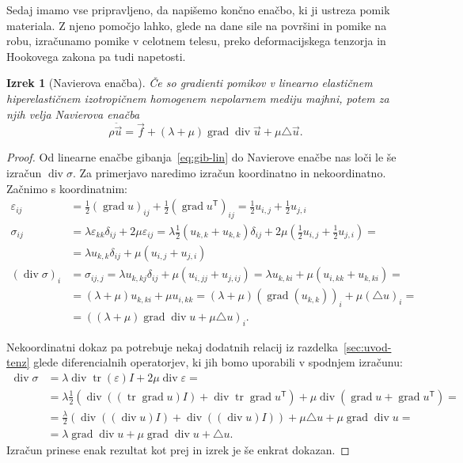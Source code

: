 \documentclass[12pt,a4paper,twoside]{article}
\theoremstyle{definition} %
\theoremstyle{plain} %
\newtheorem{izrek}[definicija]{Izrek}
\numberwithin{equation}{section}
\newcommand{\T}{\mathsf{T}}
\newcommand{\lap}{\triangle}
\renewcommand{\div}{\operatorname{div}}
\newcommand{\grad}{\operatorname{grad}}
\newcommand{\eps}{\varepsilon}
\newcommand{\vu}{\vec{u}}
\newcommand{\vf}{\vec{f}}
\newcommand{\ts}{\sigma}
\DeclareMathOperator{\tr}{tr}
\begin{document}
Sedaj imamo vse pripravljeno, da napišemo končno enačbo, ki ji ustreza pomik
materiala. Z njeno pomočjo lahko, glede na dane sile na površini in pomike na
robu, izračunamo pomike v celotnem telesu, preko deformacijskega tenzorja in
Hookovega zakona pa tudi napetosti.
\begin{izrek}[Navierova enačba]
  Če so gradienti pomikov v linearno elastičnem hiperelastičnem
  izotropičnem homogenem nepolarnem mediju majhni, potem za njih velja
  \emph{Navierova enačba}
  \begin{equation}
    \rho \ddot{\vu} = \vf + (\lambda + \mu)\grad\div \vu + \mu \lap \vu.
    \label{eq:navier}
  \end{equation}
\end{izrek}
\begin{proof}
Od linearne enačbe gibanja~\eqref{eq:gib-lin} do Navierove enačbe nas loči le še
izračun $\div \sigma$. Za primerjavo naredimo izračun koordinatno in
nekoordinatno. Začnimo s koordinatnim:
\begin{align*}
  \eps_{ij} &= \frac12 (\grad u)_{ij} + \frac12 (\grad u^\T)_{ij} =
  \frac12 u_{i,j} + \frac12 u_{j,i} \\
  \ts_{ij} &= \lambda \eps_{kk} \delta_{ij} + 2 \mu \eps_{ij} =
  \lambda \frac{1}{2} (u_{k,k} + u_{k,k}) \delta_{ij} + 2 \mu( \frac12 u_{i,j} +
  \frac12 u_{j,i}) =  \\ &= \lambda u_{k, k}\delta_{ij} + \mu (u_{i,j} +u_{j,i})
  \\
  (\div \ts)_i &= \sigma_{ij,j} = \lambda u_{k, kj}\delta_{ij} + \mu (u_{i,jj}
+u_{j,ij}) = \lambda u_{k,ki} + \mu (u_{i,kk} + u_{k,ki}) = \\
&= (\lambda + \mu)u_{k,ki} + \mu u_{i,kk} = (\lambda+\mu)(\grad(u_{k,k}))_i +
\mu (\lap u)_i = \\ &=
((\lambda + \mu)\grad\div u + \mu \lap u)_i.
\end{align*}

Nekoordinatni dokaz pa potrebuje nekaj dodatnih relacij iz
razdelka~\ref{sec:uvod-tenz} glede diferencialnih operatorjev, ki jih bomo
uporabili v spodnjem izračunu:
\begin{align*}
  \div\ts &= \lambda \div \tr(\eps) I + 2\mu \div \eps = \\ &=
  \lambda \frac12(\div((\tr\grad u)I) + \div\tr\grad u^\T) + \mu \div(\grad u + \grad
  u^\T) = \\
  &= \frac{\lambda}{2} (\div((\div u) I) + \div( (\div u)I)) + \mu \lap u + \mu
  \grad \div u = \\
  &= \lambda \grad \div u + \mu \grad \div u + \lap u.
\end{align*}
Izračun prinese enak rezultat kot prej in izrek je še enkrat dokazan.
\end{proof}
\end{document}
